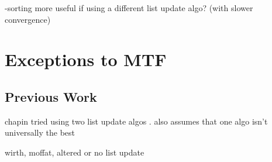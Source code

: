 \documentclass[a4paper]{scrreprt}
\begin{document}
-sorting more useful if using a different list update algo? (with slower
convergence)

\chapter{Exceptions to MTF}

\section{Previous Work}

chapin tried using two list update algos
\cite{chapin2000switching,chapin2001diss}. also assumes that one algo isn't
universally the best

wirth, moffat, altered or no list update \cite{wirth2001ranks}



\end{document}
